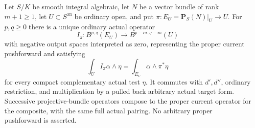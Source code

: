 \begin{theorem}
\label{r16out:bundle}
Let $S/K$ be smooth integral algebraic, let $N$ be a vector bundle
of rank $m+1\geq1$, let $U\subset S^{\mathrm{an}}$ be ordinary open,
and put $\pi:E_U=\mathbf P_S(N)|_U\to U$.  For $p,q\geq0$ there is
a unique ordinary actual operator
\[
 I_\pi:B^{p,q}(E_U)\longrightarrow B^{p-m,q-m}(U)
 \tag{OUT16.10}\label{r16out:bundle-map}
\]
with negative output spaces interpreted as zero, representing the
proper current pushforward and satisfying
\[
 \int_U I_\pi\alpha\wedge\eta=\int_{E_U}\alpha\wedge\pi^*\eta
 \tag{OUT16.11}\label{r16out:bundle-pairing}
\]
for every compact complementary actual test $\eta$.  It commutes
with $d',d''$, ordinary restriction, and multiplication by a pulled
back arbitrary actual target form.  Successive projective-bundle
operators compose to the proper current operator for the composite,
with the same full actual pairing.  No arbitrary proper pushforward
is asserted.
\end{theorem}

